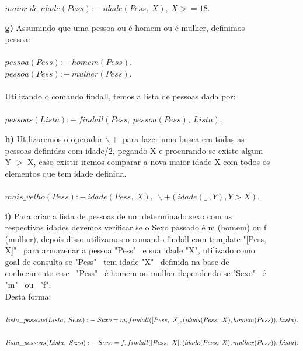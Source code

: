 \documentclass[12pt]{article}
\begin{document}
\begin{itemize}
\begin{itemize}
					$maior\_de\_idade(Pess) :- \ idade(Pess, \ X), \ X >= 18.$\\
				\item[\textbf{g) }]
					\hfill\newline
					Assumindo que uma pessoa ou é homem ou é mulher, definimos pessoa:\\ \\
					$pessoa(Pess) :- \ homem(Pess).$\\
					$pessoa(Pess) :- \ mulher(Pess).$\\ \\
					Utilizando o comando findall, temos a lista de pessoas dada por:\\ \\
					$pessoas(Lista) :- \ findall(Pess, \ pessoa(Pess), \ Lista).$\\
				\item[\textbf{h) }]
					\hfill\newline
					Utilizaremos o operador $\backslash +$ para fazer uma busca em todas
					as pessoas definidas com idade/2, pegando X e procurando se existe
					algum Y $>$ X, caso existir iremos comparar a nova maior idade X com todos
					os elementos que tem idade definida.\\ \\
					$mais\_velho(Pess) :- \ idade(Pess, \ X), \ \backslash + (idade(\_ \ , Y), Y > X).$\\
				\item[\textbf{i) }]
					\hfill\newline
					Para criar a lista de pessoas de um determinado sexo com as respectivas idades devemos
					verificar se o Sexo passado é m (homem) ou f (mulher), depois disso utilizamos o comando
					findall com template "[Pess, X]" \ para armazenar a pessoa "Pess" \ e sua idade "X", 
					utilizado como goal de consulta se "Pess" \ tem idade "X" \ definida na base de 
					conhecimento e se \ "Pess" \ é homem ou mulher dependendo se "Sexo" \ é "m" \ ou
					\ "f".\\
					Desta forma:\\ \\
					$lista\_pessoas(Lista, \ Sexo) :- \ Sexo = m, \\ 
					findall([Pess, \ X], (idade(Pess, \ X), homem(Pess)), Lista).$\\ \\
					$lista\_pessoas(Lista, \ Sexo) :- \ Sexo = f, \\
					findall([Pess, \ X], (idade(Pess, \ X), mulher(Pess)), Lista).$\\

\end{itemize}
\end{itemize}
\end{document}
